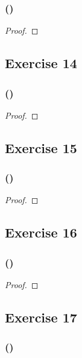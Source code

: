 \documentclass[14pt]{extarticle}
\begin{document}
\subsubsection{()}

\begin{proof}

\end{proof}

\subsection{Exercise 14}

\subsubsection{()}

\begin{proof}

\end{proof}

\subsection{Exercise 15}

\subsubsection{()}

\begin{proof}

\end{proof}

\subsection{Exercise 16}

\subsubsection{()}

\begin{proof}

\end{proof}

\subsection{Exercise 17}

\subsubsection{()}
\end{document}
